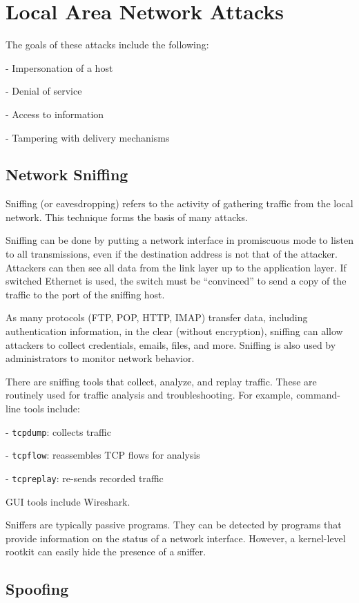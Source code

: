 \section{Local Area Network Attacks}
The goals of these attacks include the following:

- Impersonation of a host

- Denial of service

- Access to information

- Tampering with delivery mechanisms

\subsection{Network Sniffing}
Sniffing (or eavesdropping) refers to the activity of gathering traffic from the local network. This technique forms the basis of many attacks. 

Sniffing can be done by putting a network interface in promiscuous mode to listen to all transmissions, even if the destination address is not that of the attacker. Attackers can then see all data from the link layer up to the application layer. If switched Ethernet is used, the switch must be ``convinced'' to send a copy of the traffic to the port of the sniffing host. 

As many protocols (FTP, POP, HTTP, IMAP) transfer data, including authentication information, in the clear (without encryption), sniffing can allow attackers to collect credentials, emails, files, and more. Sniffing is also used by administrators to monitor network behavior. 

There are sniffing tools that collect, analyze, and replay traffic. These are routinely used for traffic analysis and troubleshooting. For example, command-line tools include:

- \texttt{tcpdump}: collects traffic

- \texttt{tcpflow}: reassembles TCP flows for analysis

- \texttt{tcpreplay}: re-sends recorded traffic

GUI tools include Wireshark. 

Sniffers are typically passive programs. They can be detected by programs that provide information on the status of a network interface. However, a kernel-level rootkit can easily hide the presence of a sniffer.

\subsection{Spoofing}

